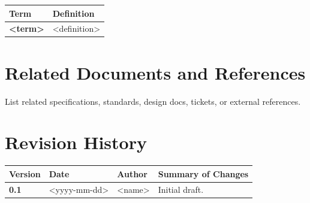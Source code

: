 \documentclass[11pt]{article}
\begin{document}
\begin{longtable}{>{\bfseries}p{} p{}}
Term & Definition \\
\hline
<term> & <definition> \\
\end{longtable}

\section{Related Documents and References}
List related specifications, standards, design docs, tickets, or
external references.

\section{Revision History}
\begin{longtable}{>{\bfseries}p{} p{} p{} p{}}
Version & Date & Author & Summary of Changes \\
\hline
0.1 & <yyyy-mm-dd> & <name> & Initial draft. \\
\end{longtable}
\end{document}

